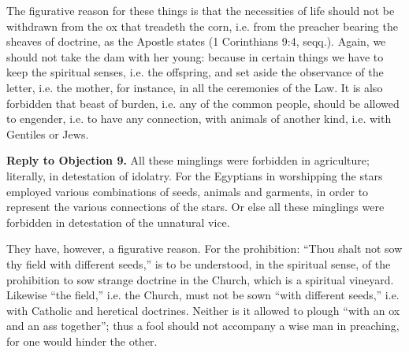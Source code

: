The figurative reason for these things is that the necessities of life should not be withdrawn from the ox that treadeth the corn, i.e. from the preacher bearing the sheaves of doctrine, as the Apostle states (1 Corinthians 9:4, seqq.). Again, we should not take the dam with her young: because in certain things we have to keep the spiritual senses, i.e. the offspring, and set aside the observance of the letter, i.e. the mother, for instance, in all the ceremonies of the Law. It is also forbidden that beast of burden, i.e. any of the common people, should be allowed to engender, i.e. to have any connection, with animals of another kind, i.e. with Gentiles or Jews.

\textbf{Reply to Objection 9.} All these minglings were forbidden in agriculture; literally, in detestation of idolatry. For the Egyptians in worshipping the stars employed various combinations of seeds, animals and garments, in order to represent the various connections of the stars. Or else all these minglings were forbidden in detestation of the unnatural vice.

They have, however, a figurative reason. For the prohibition: ``Thou shalt not sow thy field with different seeds,'' is to be understood, in the spiritual sense, of the prohibition to sow strange doctrine in the Church, which is a spiritual vineyard. Likewise ``the field,'' i.e. the Church, must not be sown ``with different seeds,'' i.e. with Catholic and heretical doctrines. Neither is it allowed to plough ``with an ox and an ass together''; thus a fool should not accompany a wise man in preaching, for one would hinder the other.


